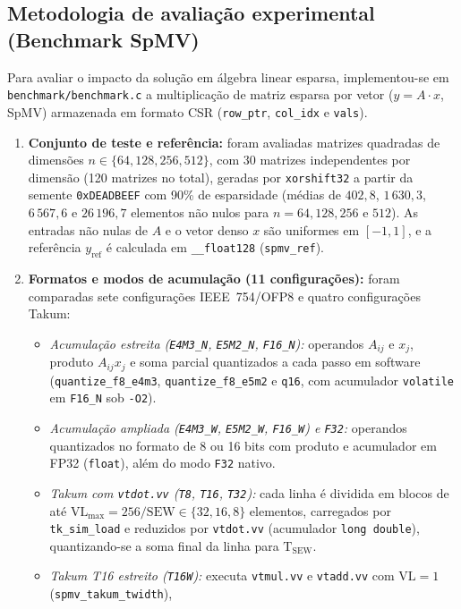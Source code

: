 \documentclass[journal]{IEEEtran}
\begin{document}
\subsection{Metodologia de avaliação experimental (Benchmark SpMV)}
Para avaliar o impacto da solução em álgebra linear esparsa, implementou-se em
\texttt{benchmark/benchmark.c} a multiplicação de matriz esparsa por vetor
($y = A\cdot x$, SpMV) armazenada em formato CSR (\texttt{row\_ptr},
\texttt{col\_idx} e \texttt{vals}).
\begin{enumerate}
\item \textbf{Conjunto de teste e referência:} foram avaliadas matrizes
quadradas de dimensões $n \in \{64, 128, 256, 512\}$, com 30 matrizes
independentes por dimensão (120 matrizes no total), geradas por
\texttt{xorshift32} a partir da semente \texttt{0xDEADBEEF} com 90\% de
esparsidade (médias de $402{,}8$, $1\,630{,}3$, $6\,567{,}6$ e $26\,196{,}7$
elementos não nulos para $n=64, 128, 256$ e $512$). As entradas não nulas de
$A$ e o vetor denso $x$ são uniformes em $[-1, 1]$, e a referência
$y_{\mathrm{ref}}$ é calculada em \texttt{\_\_float128} (\texttt{spmv\_ref}).
\item \textbf{Formatos e modos de acumulação (11 configurações):}
foram comparadas sete configurações IEEE~754/OFP8 e quatro configurações Takum:
\begin{itemize}
\item \emph{Acumulação estreita (\texttt{E4M3\_N}, \texttt{E5M2\_N},
\texttt{F16\_N}):} operandos $A_{ij}$ e $x_j$, produto $A_{ij}x_j$ e soma
parcial quantizados a cada passo em software (\texttt{quantize\_f8\_e4m3},
\texttt{quantize\_f8\_e5m2} e \texttt{q16}, com acumulador \texttt{volatile} em
\texttt{F16\_N} sob \texttt{-O2}).
\item \emph{Acumulação ampliada (\texttt{E4M3\_W}, \texttt{E5M2\_W},
\texttt{F16\_W}) e \texttt{F32}:} operandos quantizados no formato de 8 ou 16
bits com produto e acumulador em FP32 (\texttt{float}), além do modo
\texttt{F32} nativo.
\item \emph{Takum com \texttt{vtdot.vv} (\texttt{T8}, \texttt{T16},
\texttt{T32}):} cada linha é dividida em blocos de até
$\mathrm{VL}_{\max} = 256/\mathrm{SEW} \in \{32, 16, 8\}$ elementos, carregados
por \texttt{tk\_sim\_load} e reduzidos por \texttt{vtdot.vv} (acumulador
\texttt{long double}), quantizando-se a soma final da linha para
$\mathrm{T}_{\mathrm{SEW}}$.
\item \emph{Takum T16 estreito (\texttt{T16W}):} executa \texttt{vtmul.vv} e
\texttt{vtadd.vv} com $\mathrm{VL}=1$ (\texttt{spmv\_takum\_twidth}),

\end{itemize}
\end{enumerate}
\end{document}
